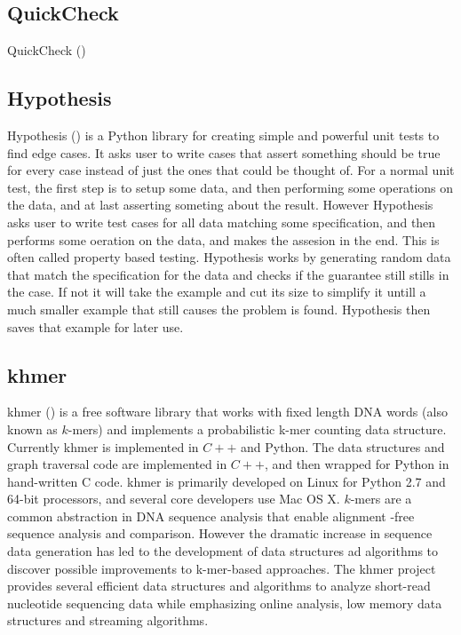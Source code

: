 \documentclass[preprint,nocopyrightspace]{sig-alternate}
\begin{document}
\subsection{QuickCheck}
QuickCheck (\citet{claessen_quickcheck:_2011})

\subsection{Hypothesis}
Hypothesis (\citet{maciver_welcome_2015}) is a Python library for creating simple and powerful unit tests to find edge cases. It asks user to write cases that assert something should be true for every case instead of just the ones that could be thought of. For a normal unit test, the first step is to setup some data, and then performing some operations on the data, and at last asserting someting about the result. However Hypothesis asks user to write test cases for all data matching some specification, and then performs some oeration on the data, and makes the assesion in the end. This is often called property based testing. Hypothesis works by generating random data that match the specification for the data and checks if the guarantee still stills in the case. If not it will take the example and cut its size to simplify it untill a much smaller example that still causes the problem is found. Hypothesis then saves that example for later use.

\subsection{khmer}
khmer (\citet{crusoe_khmer_2015}) is a free software library that works with fixed length DNA words (also known as $k$-mers) and implements a probabilistic k-mer counting data structure. Currently khmer is implemented in $C++$ and Python. The data structures and graph traversal code are implemented in $C++$, and then wrapped for Python in hand-written C code. khmer is primarily developed on Linux for Python 2.7 and 64-bit processors, and several core developers use Mac OS X. $k$-mers are a common abstraction in DNA sequence analysis that enable alignment -free sequence analysis and comparison. However the dramatic increase in sequence data generation has led to the development of data structures ad algorithms to discover possible improvements to k-mer-based approaches. The khmer project provides several efficient data structures and algorithms to analyze short-read nucleotide sequencing data while emphasizing online analysis, low memory data structures and streaming algorithms.
\end{document}
